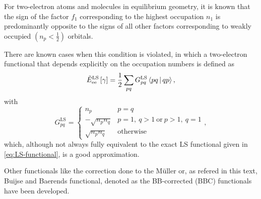 \begin{enumerate}
        For two-electron atoms and molecules in equilibrium geometry, it is 
        known that the sign of the factor $f_1$ corresponding to the highest 
        occupation $n_1$ is predominantly opposite to the signs of all other 
        factors corresponding to weakly occupied $\left( n_p < \frac{1}{2} \right)$
        orbitals.

        There are known cases when this condition is violated, in which a two-electron functional that depends 
        explicitly on the occupation numbers is defined as
        \begin{equation}
            \tilde{E}_{\text{ee}}^{\text{LS}} \left[ \fordm \right] =
            \frac{1}{2} \sum_{pq}  G_{pq}^{\text{LS}} \Braket{pq | qp},
        \end{equation}
        with 
        \begin{equation}
            G_{pq}^{\text{LS}} =
            \begin{cases}
                n_p & p = q \\
                - \sqrt{n_p n_q} & p = 1,\ q > 1\ \mathrm{or}\ p>1,\ q=1 \\
                \sqrt{n_p n_q} & \text{otherwise}
            \end{cases}
            ,
        \end{equation}
        which, although not always fully equivalent to the exact LS functional
        given in \cref{eq:LS-functional}, is a good approximation.

        Other functionals like the correction done to the Müller
        or, as refered in this text, Buijse and Baerends functional,
        denoted as the BB-corrected (BBC) functionals
        have been developed.


\end{enumerate}
